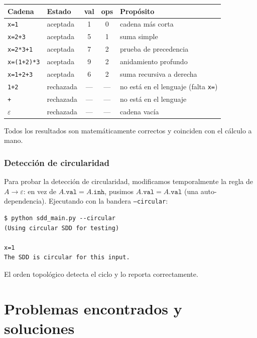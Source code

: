 \documentclass[11pt,a4paper]{article}
\begin{document}
\begin{center}
\begin{tabular}{@{}llccl@{}}
\toprule
\textbf{Cadena} & \textbf{Estado} & \textbf{val} & \textbf{ops} & \textbf{Prop\'osito} \\
\midrule
\texttt{x=1}         & aceptada & 1 & 0 & cadena m\'as corta \\
\texttt{x=2+3}       & aceptada & 5 & 1 & suma simple \\
\texttt{x=2*3+1}     & aceptada & 7 & 2 & prueba de precedencia \\
\texttt{x=(1+2)*3}   & aceptada & 9 & 2 & anidamiento profundo \\
\texttt{x=1+2+3}     & aceptada & 6 & 2 & suma recursiva a derecha \\
\texttt{1+2}          & rechazada & --- & --- & no est\'a en el lenguaje (falta \texttt{x=}) \\
\texttt{+}            & rechazada & --- & --- & no est\'a en el lenguaje \\
$\varepsilon$         & rechazada & --- & --- & cadena vac\'ia \\
\bottomrule
\end{tabular}
\end{center}

Todos los resultados son matem\'aticamente correctos y coinciden con el c\'alculo a mano.

\subsubsection*{Detecci\'on de circularidad}

Para probar la detecci\'on de circularidad, modificamos temporalmente la regla de $A \to \varepsilon$: en vez de $A.\texttt{val} = A.\texttt{inh}$, pusimos $A.\texttt{val} = A.\texttt{val}$ (una auto-dependencia). Ejecutando con la bandera \texttt{--circular}:

\begin{lstlisting}
$ python sdd_main.py --circular
(Using circular SDD for testing)

x=1
The SDD is circular for this input.
\end{lstlisting}

El orden topol\'ogico detecta el ciclo y lo reporta correctamente.


\section{Problemas encontrados y soluciones}
\label{sec:problems}
\end{document}
